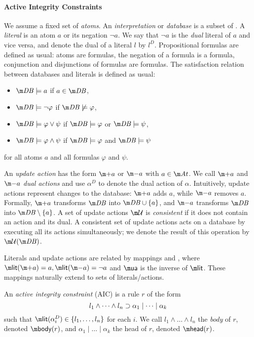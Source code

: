 \paragraph{Active Integrity Constraints}
We assume a fixed set \atoms of \emph{atoms}. An \emph{interpretation} or \emph{database} is a subset of \atoms. A \emph{literal} is an atom $a$ or its negation $\lnot a$. 
We say that $\lnot a$ is the \emph{dual} literal of $a$ and vice versa, and denote the dual of a literal $l$ by $l^D$. 
Propositional formulas are defined as usual: atoms are formulas, the negation of a formula is a formula, conjunction and disjunctions of formulas are formulas. 
The satisfaction relation between databases \db and literals is defined as usual: 
\begin{itemize}
 \item $\db \models a$ if $a\in\db$,
 \item $\db \models \lnot \varphi$ if $\db\not\models \varphi$,
 \item $\db \models \varphi\lor\psi$ if $\db\models \varphi$ or $\db \models \psi$,
 \item $\db \models \varphi\land\psi$ if $\db\models \varphi$ and $\db \models \psi$
\end{itemize}
for all atoms $a$ and all formulas $\varphi$ and $\psi$.


An \emph{update action} has the form $\add a$ or $\remove a$ with $a\in \atoms$. We call $\add a$ and $\remove a$ \emph{dual actions} and use $\alpha^D$ to denote the dual action of $\alpha$. 
Intuitively, update actions represent changes to the database: $\add a$ adds $a$, while $\remove a$ removes $a$. Formally, $\add a$ transforms $\db$ into $\db\cup\{a\}$, and $\remove a $ transforms $\db$ into $\db\setminus\{a\}$.
A set of update actions $\UU$ is \emph{consistent} if it does not contain an action and its dual. A consistent set of update actions \UU acts on a database \db by executing all its actions simultaneously; we denote the result of this operation by $\UU(\db)$. 

Literals and update actions are related by mappings \litof and \actof, where $\litof(\add a)= a, \litof(\remove a) = \lnot a$ and $\actof$ is the inverse of $\litof$.
These mappings naturally extend to sets of literals/actions. 

\begin{definition}
 An \emph{active integrity constraint} (AIC) is a rule $r$ of the form
  \begin{equation} l_1\land \dots\land l_n\supset \alpha_1\mid\dots \mid \alpha_k \label{eq:aic}\end{equation}
  such that $\litof(\alpha_i^D) \in \{l_1,\dots,l_n\}$ for each $i$.
%  
  We call $l_1\land \dots \land l_n$ the \emph{body} of $r$, denoted $\body(r)$, and $\alpha_1\mid\dots \mid \alpha_k$ the head of $r$, denoted $\head (r)$.
\end{definition}


